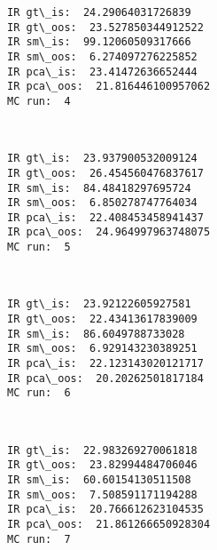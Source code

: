 \documentclass[11pt]{article}
\begin{document}
    \begin{Verbatim}[commandchars=\\\{\},fontsize=\footnotesize]
IR gt\_is:  24.29064031726839
IR gt\_oos:  23.527850344912522
IR sm\_is:  99.12060509317666
IR sm\_oos:  6.274097276225852
IR pca\_is:  23.41472636652444
IR pca\_oos:  21.816446100957062
MC run:  4

    \end{Verbatim}

    \begin{center}
    \end{center}
    { \hspace*{\fill} \\}
    
    \begin{Verbatim}[commandchars=\\\{\},fontsize=\footnotesize]
IR gt\_is:  23.937900532009124
IR gt\_oos:  26.454560476837617
IR sm\_is:  84.48418297695724
IR sm\_oos:  6.850278747764034
IR pca\_is:  22.408453458941437
IR pca\_oos:  24.964997963748075
MC run:  5

    \end{Verbatim}

    \begin{center}
    \end{center}
    { \hspace*{\fill} \\}
    
    \begin{Verbatim}[commandchars=\\\{\},fontsize=\footnotesize]
IR gt\_is:  23.92122605927581
IR gt\_oos:  22.43413617839009
IR sm\_is:  86.6049788733028
IR sm\_oos:  6.929143230389251
IR pca\_is:  22.123143020121717
IR pca\_oos:  20.20262501817184
MC run:  6

    \end{Verbatim}

    \begin{center}
    \end{center}
    { \hspace*{\fill} \\}
    
    \begin{Verbatim}[commandchars=\\\{\},fontsize=\footnotesize]
IR gt\_is:  22.983269270061818
IR gt\_oos:  23.82994484706046
IR sm\_is:  60.60154130511508
IR sm\_oos:  7.508591171194288
IR pca\_is:  20.766612623104535
IR pca\_oos:  21.861266650928304
MC run:  7

    \end{Verbatim}
\end{document}
